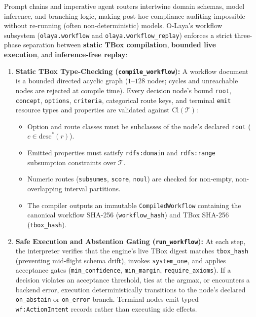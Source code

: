 \documentclass[11pt,a4paper]{article}
\begin{document}
Prompt chains and imperative agent routers intertwine domain schemas, model inference, and branching logic, making post-hoc compliance auditing impossible without re-running (often non-deterministic) models. O-Laya's workflow subsystem (\texttt{olaya.workflow} and \texttt{olaya.workflow\_replay}) enforces a strict three-phase separation between \textbf{static TBox compilation}, \textbf{bounded live execution}, and \textbf{inference-free replay}:

\begin{enumerate}[leftmargin=1.8em,itemsep=0.3em]
  \item \textbf{Static TBox Type-Checking (\texttt{compile\_workflow}):}
  A workflow document is a bounded directed acyclic graph ($1\text{--}128$ nodes; cycles and unreachable nodes are rejected at compile time). Every decision node's bound \texttt{root}, \texttt{concept}, \texttt{options}, \texttt{criteria}, categorical route keys, and terminal \texttt{emit} resource types and properties are validated against $\mathrm{Cl}(\mathcal{T})$:
  \begin{itemize}[leftmargin=1.4em,itemsep=0.15em]
    \item Option and route classes must be subclasses of the node's declared \texttt{root} ($c \in \mathrm{desc}^*(r)$).
    \item Emitted properties must satisfy \texttt{rdfs:domain} and \texttt{rdfs:range} subsumption constraints over $\mathcal{T}$.
    \item Numeric routes (\texttt{subsumes}, \texttt{score}, \texttt{noul}) are checked for non-empty, non-overlapping interval partitions.
    \item The compiler outputs an immutable \texttt{CompiledWorkflow} containing the canonical workflow SHA-256 (\texttt{workflow\_hash}) and TBox SHA-256 (\texttt{tbox\_hash}).
  \end{itemize}

  \item \textbf{Safe Execution and Abstention Gating (\texttt{run\_workflow}):}
  At each step, the interpreter verifies that the engine's live TBox digest matches \texttt{tbox\_hash} (preventing mid-flight schema drift), invokes \texttt{system\_one}, and applies acceptance gates (\texttt{min\_confidence}, \texttt{min\_margin}, \texttt{require\_axioms}). If a decision violates an acceptance threshold, ties at the argmax, or encounters a backend error, execution deterministically transitions to the node's declared \texttt{on\_abstain} or \texttt{on\_error} branch. Terminal nodes emit typed \texttt{wf:ActionIntent} records rather than executing side effects.


\end{enumerate}
\end{document}
